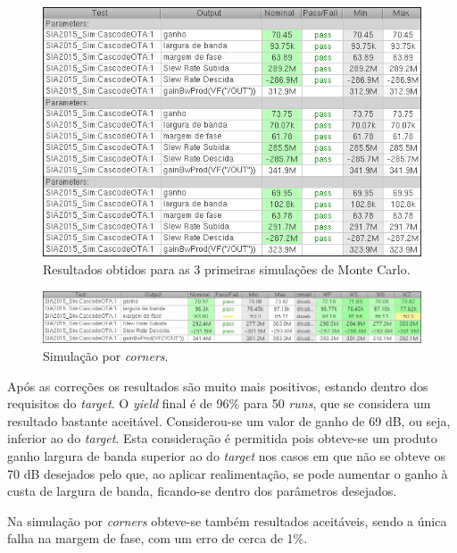 \documentclass[11pt]{article}
\numberwithin{equation}{section}
\begin{document}
\begin{figure}[H]
	\centering
	\includegraphics[keepaspectratio=true, scale=0.65]{exps/MonteCarlo_3pt_Novo}
	\vspace{-0.5em}
	\caption{Resultados obtidos para as 3 primeiras simulações de Monte Carlo.}
	\vspace{-0.8em}
\end{figure} 

\begin{figure}[H]
	\centering
	\includegraphics[keepaspectratio=true, scale=0.65]{exps/Corners_Novo_semDiv}
	\vspace{-0.5em}
	\caption{Simulação por \textit{corners}.}
	\vspace{-0.8em}
\end{figure} 

Após as correções os resultados são muito mais positivos, estando dentro dos requisitos do \textit{target}. O \textit{yield} final é de 96\% para 50 \textit{runs}, que se considera um resultado bastante aceitável. Considerou-se um valor de ganho de 69 dB, ou seja, inferior ao do \textit{target}. Esta consideração é permitida pois obteve-se um produto ganho largura de banda superior ao do \textit{target} nos casos em que não se obteve os 70 dB desejados pelo que, ao aplicar realimentação, se pode aumentar o ganho à custa de largura de banda, ficando-se dentro dos parâmetros desejados.

Na simulação por \textit{corners} obteve-se também resultados aceitáveis, sendo a única falha na margem de fase, com um erro de cerca de 1\%. 
\end{document}
